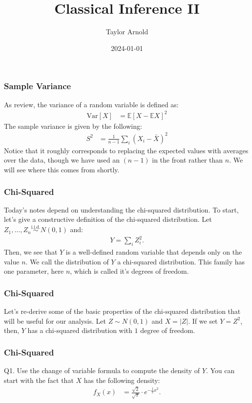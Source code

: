 \documentclass{beamer}
\title{Classical Inference II}
\author{Taylor Arnold}
\date{2024-01-01}
\newcommand{\iid}{\overset{\mathrm{i.i.d.}}{\sim}}
\newcommand{\E}{\mathbb{E}}
\newcommand{\V}{\text{Var}}
\begin{document}
\frame{\titlepage}


\begin{frame}
\frametitle{Sample Variance}

As review, the variance of a random variable is defined as:
\begin{align*}
\V [X] &= \E [X - \E X]^2
\end{align*}
The sample variance is given by the following:
\begin{align*}
S^2 &= \frac{1}{n - 1} \sum_i (X_i - \bar{X})^2
\end{align*}
Notice that it roughly corresponds to replacing the expected values with
averages over the data, though we have used an $(n-1)$ in the front rather
than $n$. We will see where this comes from shortly.

\end{frame}

\begin{frame}
\frametitle{Chi-Squared}

Today's notes depend on understanding the chi-squared distribution. To start, let's
give a constructive definition of the chi-squared distribution.
Let $Z_1, \ldots, Z_n \iid N(0, 1)$ and:
\begin{align*}
Y = \sum_i Z_i^2.
\end{align*}
Then, we see that $Y$ is a well-defined random variable that depends only on the 
value $n$. We call the distribution of $Y$ a \alert{chi-squared distribution}. This
family has one parameter, here $n$, which is called it's degrees of freedom.

\end{frame}

\begin{frame}
\frametitle{Chi-Squared}

Let's re-derive some of the basic properties of the chi-squared distribution that 
will be useful for our analysis. Let $Z \sim N(0, 1)$ and $X = |Z|$. If we set
$Y = Z^2$, then, $Y$ has a chi-squared distribution with $1$ degree of freedom. 

\end{frame}

\begin{frame}
\frametitle{Chi-Squared}

Q1. Use the change of variable formula to compute the density of $Y$. You can start
with the fact that $X$ has the following density:
\begin{align*}
f_X(x) &= \frac{\sqrt{2}}{\sqrt{\pi}} \cdot e^{-\frac{1}{2}x^2}.
\end{align*}

\end{frame}
\end{document}
